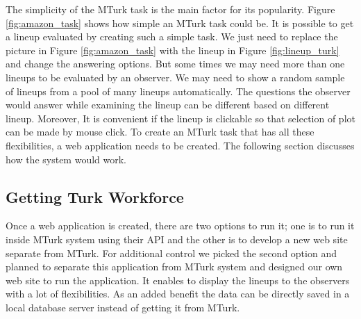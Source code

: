 \documentclass[11pt]{article}
\begin{document}
The simplicity of the MTurk task is the main factor for its popularity. Figure \ref{fig:amazon_task} shows how simple an MTurk task could be. It is possible to get a lineup evaluated by creating such a simple task. We just need to replace the picture in Figure \ref{fig:amazon_task} with the lineup in Figure \ref{fig:lineup_turk} and change the answering options. But some times we may need more than one lineups to be evaluated by an observer. We may need to show a random sample of lineups from a pool of many lineups automatically. The questions the observer would answer while examining the lineup can be different based on different lineup. Moreover, It is convenient if the lineup is clickable so that selection of plot can be made by mouse click. To create an MTurk task that has all these flexibilities, a web application needs to be created. The following section discusses how the system would work.





\subsection{Getting Turk Workforce}

Once a web application is created, there are two options to run it; one is to run it inside MTurk system using their API and the other is to develop a new web site separate from MTurk. For additional control we picked the second option and planned to separate this application from MTurk system and designed our own web site to run the application. It enables to display the lineups to the observers with a lot of flexibilities. As an added benefit the data can be directly saved in a local database server instead of getting it from MTurk. 
\end{document}
